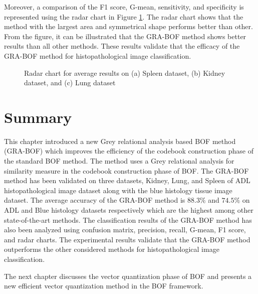 Moreover, a comparison of the F1 score, G-mean, sensitivity, and specificity is represented using the radar chart in Figure \ref{ch5:fig:radar}. The radar chart shows that the method with the largest area and symmetrical shape performs better than other. From the figure, it can be illustrated that the GRA-BOF method shows better results than all other methods. These results validate that the efficacy of the GRA-BOF method for histopathological image classification.
\begin{figure}[t]
\centering
{}
 \caption[Radar chart for average results on Spleen dataset, Kidney dataset, and Lung dataset]{\fontsize{10pt}{12pt}\selectfont Radar chart for average results on (a) Spleen dataset, (b) Kidney dataset, and (c) Lung dataset}
\label{ch5:fig:radar}
\end{figure}

\section{Summary}\label{sec:con}

This chapter introduced a new Grey relational analysis based BOF method (GRA-BOF) which improves the efficiency of the codebook construction phase of the standard BOF method. The method uses a Grey relational analysis for similarity measure in the codebook construction phase of BOF. The GRA-BOF method has been validated on three datasets, Kidney, Lung, and Spleen of ADL histopathological image dataset along with the blue histology tissue image dataset. The average accuracy of the GRA-BOF method is $88.3\%$ and $74.5\%$ on ADL and Blue histology datasets respectively which are the highest among other state-of-the-art methods. The classification results of the GRA-BOF method has also been analyzed using confusion matrix, precision, recall, G-mean, F1 score, and radar charts. The experimental results validate that the GRA-BOF method outperforms the other considered methods for histopathological image classification. 

The next chapter discusses the vector quantization phase of BOF and presents a new efficient vector quantization method in the BOF framework.